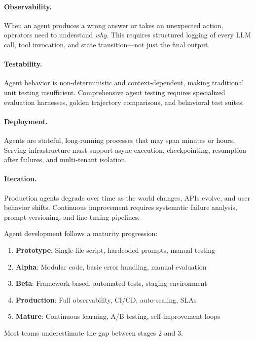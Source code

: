 \paragraph{Observability.}
\label{observability.}

When an agent produces a wrong answer or takes an unexpected action, operators need to understand \emph{why}. This requires structured logging of every LLM call, tool invocation, and state transition---not just the final output.

\paragraph{Testability.}
\label{testability.}

Agent behavior is non-deterministic and context-dependent, making traditional unit testing insufficient. Comprehensive agent testing requires specialized evaluation harnesses, golden trajectory comparisons, and behavioral test suites.

\paragraph{Deployment.}
\label{deployment.}

Agents are stateful, long-running processes that may span minutes or hours. Serving infrastructure must support async execution, checkpointing, resumption after failures, and multi-tenant isolation.

\paragraph{Iteration.}
\label{iteration.}

Production agents degrade over time as the world changes, APIs evolve, and user behavior shifts. Continuous improvement requires systematic failure analysis, prompt versioning, and fine-tuning pipelines.

\begin{intuitionbox}
Agent development follows a maturity progression:

\begin{enumerate}
  \item \textbf{Prototype}: Single-file script, hardcoded prompts, manual testing
  \item \textbf{Alpha}: Modular code, basic error handling, manual evaluation
  \item \textbf{Beta}: Framework-based, automated tests, staging environment
  \item \textbf{Production}: Full observability, CI/CD, auto-scaling, SLAs
  \item \textbf{Mature}: Continuous learning, A/B testing, self-improvement loops
\end{enumerate}

Most teams underestimate the gap between stages 2 and 3.
\end{intuitionbox}

